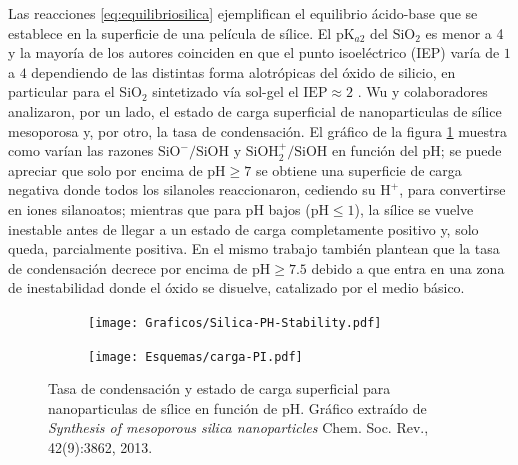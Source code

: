 	Las reacciones \ref{eq:equilibriosilica} ejemplifican el equilibrio ácido-base que se establece en la superficie de una película de sílice. El pK$_{a2}$ del $\text{SiO}_2$ es menor a 4 y la mayoría de los autores coinciden en que el punto isoeléctrico (IEP) varía de $1$ a $4$ dependiendo de  las distintas forma alotrópicas del óxido de silicio, en particular para el SiO$_2$ sintetizado vía sol-gel el $\text{IEP}\approx 2$ \cite{Kosmulski2002,Kosmulski2014,Schwarz1984,Si-HanWu2013}.
	Wu y colaboradores\cite{Si-HanWu2013} analizaron, por un lado, el estado de carga superficial de nanoparticulas de sílice mesoporosa y, por otro, la tasa de condensación. El gráfico de la figura \ref{fig:silica_ph} muestra como varían las razones  $\text{SiO}^{-}/\text{SiOH}$ y $\text{SiOH}_2^{+}/\text{SiOH}$ en función del pH; se puede apreciar que solo por encima de $\text{pH}\geq7$ se obtiene una superficie de carga negativa donde todos los silanoles reaccionaron, cediendo su $\text{H}^{+}$, para convertirse en iones silanoatos; mientras que para pH bajos ($\text{pH}\leq1$), la sílice se vuelve inestable antes de llegar a un estado de carga completamente positivo y, solo queda, parcialmente positiva. En el mismo trabajo\cite{Si-HanWu2013} también plantean que la tasa de condensación decrece por encima de $\text{pH}\geq7.5$ debido a que entra en una zona de inestabilidad donde el óxido se disuelve, catalizado por el medio básico.
		\begin{figure}[th!]
			\begin{subfigure}[t]{0.73\textwidth}
 	       	\texttt{[image: Graficos/Silica-PH-Stability.pdf]}
 	       	\end{subfigure}
 	       	\begin{subfigure}[t]{0.25\textwidth}
 	       	 	\texttt{[image: Esquemas/carga-PI.pdf]}
	      	 \end{subfigure}
	    	\caption[Tasa de condensación y estado de carga superficial]{Tasa de condensación y estado de carga superficial para nanoparticulas de sílice en función de pH. Gráfico extraído de \textit{Synthesis of mesoporous silica nanoparticles} Chem. Soc. Rev., 42(9):3862, 2013.\cite{Si-HanWu2013}}
	       	\label{fig:silica_ph}
	    	\end{figure}
